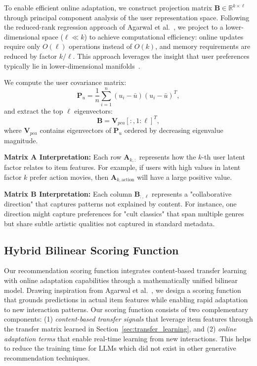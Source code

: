 \documentclass[acmsmall]{acmart}
\begin{document}
To enable efficient online adaptation, we construct projection matrix $\mathbf{B} \in \mathbb{R}^{k \times \ell}$ through principal component analysis of the user representation space. Following the reduced-rank regression approach of Agarwal et al.~\cite{agarwal2010fast}, we project to a lower-dimensional space ($\ell \ll k$) to achieve computational efficiency: online updates require only $O(\ell)$ operations instead of $O(k)$, and memory requirements are reduced by factor $k/\ell$. This approach leverages the insight that user preferences typically lie in lower-dimensional manifolds~\cite{koren2009matrix}.

We compute the user covariance matrix:
\begin{equation}
\mathbf{P}_u = \frac{1}{n} \sum_{i=1}^n (u_i - \bar{u})(u_i - \bar{u})^T,
\label{eq:user_covariance}
\end{equation}
and extract the top $\ell$ eigenvectors:
\begin{equation}
\mathbf{B} = \mathbf{V}_{pca}[:, 1:\ell]^T,
\label{eq:B_matrix_pca}
\end{equation}
where $\mathbf{V}_{pca}$ contains eigenvectors of $\mathbf{P}_u$ ordered by decreasing eigenvalue magnitude.


\textbf{Matrix A Interpretation:} Each row $\mathbf{A}_{k,:}$ represents how the $k$-th user latent factor relates to item features. For example, if users with high values in latent factor $k$ prefer action movies, then $\mathbf{A}_{k,\text{action}}$ will have a large positive value.

\textbf{Matrix B Interpretation:} Each column $\mathbf{B}_{:,\ell}$ represents a "collaborative direction" that captures patterns not explained by content. For instance, one direction might capture preferences for "cult classics" that span multiple genres but share subtle artistic qualities not captured in standard metadata.

\subsection{Hybrid Bilinear Scoring Function}
\label{sec:bilinear_scoring}

Our recommendation scoring function integrates content-based transfer learning with online adaptation capabilities through a mathematically unified bilinear model. Drawing inspiration from Agarwal et al.~\cite{agarwal2010fast}, we design a scoring function that grounds predictions in actual item features while enabling rapid adaptation to new interaction patterns.
 Our scoring function consists of two complementary components: (1) \textit{content-based transfer signals} that leverage item features through the transfer matrix learned in Section~\ref{sec:transfer_learning}, and (2) \textit{online adaptation terms} that enable real-time learning from new interactions. This helps to reduce the training time for LLMs which did not exist in other generative recommendation techniques.
\end{document}
